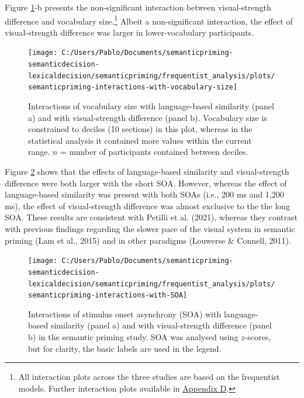 \documentclass[
  12pt,
  man,floatsintext]{apa7}
\begin{document}
Figure \ref{fig:semanticpriming-interactions-with-vocabulary-size}-b presents the non-significant interaction between visual-strength difference and vocabulary size.\footnote{All interaction plots across the three studies are based on the frequentist models. Further interaction plots available in \protect\hyperlink{appendix-D-interaction-plots}{\underline{Appendix D}}.} Albeit a non-significant interaction, the effect of visual-strength difference was larger in lower-vocabulary participants.



\begin{figure}

{\centering \texttt{[image: C:/Users/Pablo/Documents/semanticpriming-semanticdecision-lexicaldecision/semanticpriming/frequentist\_analysis/plots/semanticpriming-interactions-with-vocabulary-size]} 

}

\caption{Interactions of vocabulary size with language-based similarity (panel a) and with visual-strength difference (panel b). Vocabulary size is constrained to deciles (10 sections) in this plot, whereas in the statistical analysis it contained more values within the current range. \(n\) = number of participants contained between deciles.}\label{fig:semanticpriming-interactions-with-vocabulary-size}
\end{figure}

Figure \ref{fig:semanticpriming-interactions-with-SOA} shows that the effects of language-based similarity and visual-strength difference were both larger with the short SOA. However, whereas the effect of language-based similarity was present with both SOAs (i.e., 200 ms and 1,200 ms), the effect of visual-strength difference was almost exclusive to the the long SOA. These results are consistent with Petilli et al. (2021), whereas they contrast with previous findings regarding the slower pace of the visual system in semantic priming (Lam et al., 2015) and in other paradigms (Louwerse \& Connell, 2011).

\begin{figure}

{\centering \texttt{[image: C:/Users/Pablo/Documents/semanticpriming-semanticdecision-lexicaldecision/semanticpriming/frequentist\_analysis/plots/semanticpriming-interactions-with-SOA]} 

}

\caption{Interactions of stimulus onset asynchrony (SOA) with language-based similarity (panel a) and with visual-strength difference (panel b) in the semantic priming study. SOA was analysed using $z$-scores, but for clarity, the basic labels are used in the legend.}\label{fig:semanticpriming-interactions-with-SOA}
\end{figure}
\end{document}
